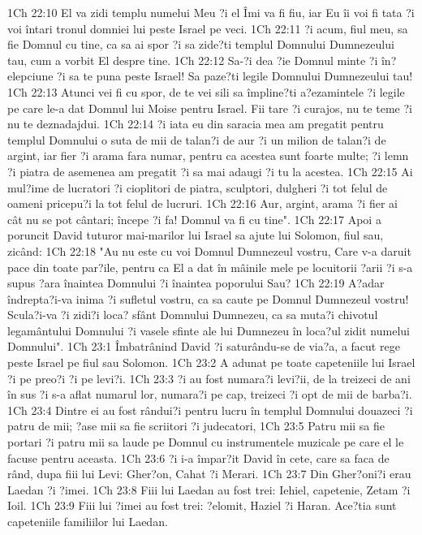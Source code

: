 1Ch 22:10  El va zidi templu numelui Meu ?i el Îmi va fi fiu, iar Eu îi voi fi tata ?i voi întari tronul domniei lui peste Israel pe veci.
1Ch 22:11  ?i acum, fiul meu, sa fie Domnul cu tine, ca sa ai spor ?i sa zide?ti templul Domnului Dumnezeului tau, cum a vorbit El despre tine.
1Ch 22:12  Sa-?i dea ?ie Domnul minte ?i în?elepciune ?i sa te puna peste Israel! Sa paze?ti legile Domnului Dumnezeului tau!
1Ch 22:13  Atunci vei fi cu spor, de te vei sili sa împline?ti a?ezamintele ?i legile pe care le-a dat Domnul lui Moise pentru Israel. Fii tare ?i curajos, nu te teme ?i nu te deznadajdui.
1Ch 22:14  ?i iata eu din saracia mea am pregatit pentru templul Domnului o suta de mii de talan?i de aur ?i un milion de talan?i de argint, iar fier ?i arama fara numar, pentru ca acestea sunt foarte multe; ?i lemn ?i piatra de asemenea am pregatit ?i sa mai adaugi ?i tu la acestea.
1Ch 22:15  Ai mul?ime de lucratori ?i cioplitori de piatra, sculptori, dulgheri ?i tot felul de oameni pricepu?i la tot felul de lucruri.
1Ch 22:16  Aur, argint, arama ?i fier ai cât nu se pot cântari; începe ?i fa! Domnul va fi cu tine".
1Ch 22:17  Apoi a poruncit David tuturor mai-marilor lui Israel sa ajute lui Solomon, fiul sau, zicând:
1Ch 22:18  "Au nu este cu voi Domnul Dumnezeul vostru, Care v-a daruit pace din toate par?ile, pentru ca El a dat în mâinile mele pe locuitorii ?arii ?i s-a supus ?ara înaintea Domnului ?i înaintea poporului Sau?
1Ch 22:19  A?adar îndrepta?i-va inima ?i sufletul vostru, ca sa caute pe Domnul Dumnezeul vostru! Scula?i-va ?i zidi?i loca? sfânt Domnului Dumnezeu, ca sa muta?i chivotul legamântului Domnului ?i vasele sfinte ale lui Dumnezeu în loca?ul zidit numelui Domnului".
1Ch 23:1  Îmbatrânind David ?i saturându-se de via?a, a facut rege peste Israel pe fiul sau Solomon.
1Ch 23:2  A adunat pe toate capeteniile lui Israel ?i pe preo?i ?i pe levi?i.
1Ch 23:3  ?i au fost numara?i levi?ii, de la treizeci de ani în sus ?i s-a aflat numarul lor, numara?i pe cap, treizeci ?i opt de mii de barba?i.
1Ch 23:4  Dintre ei au fost rândui?i pentru lucru în templul Domnului douazeci ?i patru de mii; ?ase mii sa fie scriitori ?i judecatori,
1Ch 23:5  Patru mii sa fie portari ?i patru mii sa laude pe Domnul cu instrumentele muzicale pe care el le facuse pentru aceasta.
1Ch 23:6  ?i i-a împar?it David în cete, care sa faca de rând, dupa fiii lui Levi: Gher?on, Cahat ?i Merari.
1Ch 23:7  Din Gher?oni?i erau Laedan ?i ?imei.
1Ch 23:8  Fiii lui Laedan au fost trei: Iehiel, capetenie, Zetam ?i Ioil.
1Ch 23:9  Fiii lui ?imei au fost trei: ?elomit, Haziel ?i Haran. Ace?tia sunt capeteniile familiilor lui Laedan.
